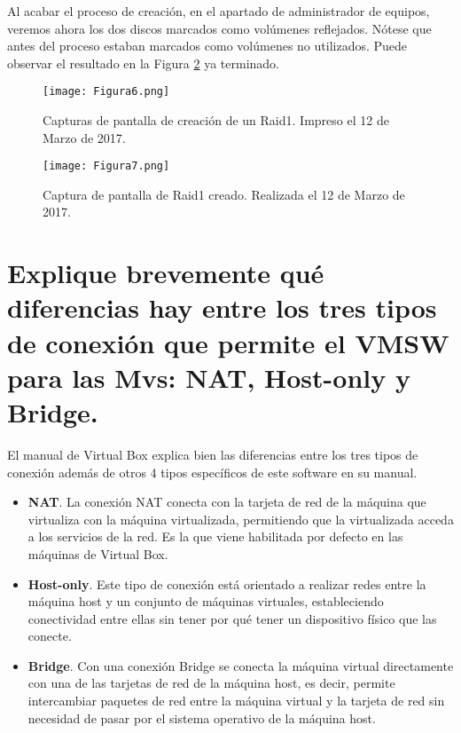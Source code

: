 \vspace{8mm}

Al acabar el proceso de creación, en el apartado de administrador de equipos, veremos ahora los dos discos marcados como volúmenes reflejados. Nótese que antes del proceso
estaban marcados como volúmenes no utilizados. Puede observar el resultado en la Figura \ref{fig:figura7} ya terminado.

\begin{figure}[H]
\centering
\texttt{[image: Figura6.png]}
\caption{Capturas de pantalla de creación de un Raid1. Impreso el 12 de Marzo de 2017.} \label{fig:figura6}
\end{figure}


\begin{figure}[H]
\centering
\texttt{[image: Figura7.png]} 
\caption{Captura de pantalla de Raid1 creado. Realizada el 12 de Marzo de 2017.} \label{fig:figura7}
\end{figure}




\section{Explique brevemente qué diferencias hay entre los tres tipos de conexión que permite el VMSW para las Mvs: NAT, Host-only y Bridge.} 

El manual de Virtual Box explica bien las diferencias entre los tres tipos de conexión además de otros 4 tipos específicos de este software en su manual\cite{networking}. 
\begin{itemize}
\item \textbf{NAT}. La conexión NAT conecta con la tarjeta de red de la máquina que virtualiza con la máquina virtualizada, permitiendo que la virtualizada 
acceda a los servicios de la red. Es la que viene habilitada por defecto en las máquinas de Virtual Box.
\item \textbf{Host-only}. Este tipo de conexión está orientado a realizar redes entre la máquina host y un conjunto de máquinas virtuales, estableciendo conectividad entre ellas sin
tener por qué tener un dispositivo físico que las conecte.
\item \textbf{Bridge}. Con una conexión Bridge se conecta la máquina virtual directamente con una de las tarjetas de red de la máquina host, es decir, permite intercambiar paquetes 
de red entre la máquina virtual y la tarjeta de red sin necesidad de pasar por el sistema operativo de la máquina host.
\end{itemize}




